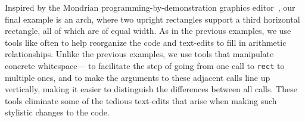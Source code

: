 Inspired by the Mondrian programming-by-demonstration graphics editor~\cite{Mondrian},
our final example is an arch, where two upright
rectangles support a third horizontal rectangle, all of which are of
equal width. As in the previous examples, we use tools like  often to help reorganize the code and text-edits to fill in
arithmetic relationships. Unlike the previous examples, we use tools
that manipulate concrete whitespace--- to facilitate
the step of going from one call to \verb+rect+ to multiple ones, and
 to make the arguments to these adjacent calls line up
vertically, making it easier to distinguish the differences between
all calls. These tools eliminate some of the tedious text-edits that
arise when making such stylistic changes to the code.

